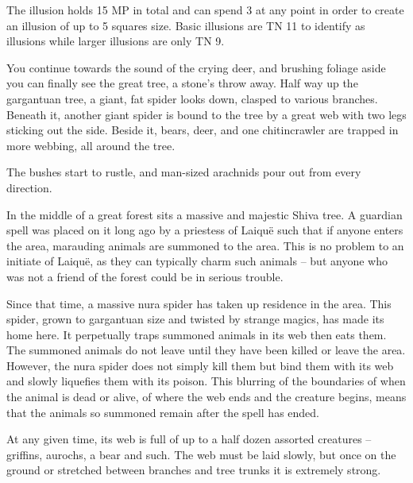 \begin{multicols}{2}
The illusion holds 15 MP in total and can spend 3 at any point in order to create an illusion of up to 5 squares size.  Basic illusions are TN 11 to identify as illusions while larger illusions are only TN 9.


\begin{boxtext}

	You continue towards the sound of the crying deer, and brushing foliage aside you can finally see the great tree, a stone's throw away.
	Half way up the gargantuan tree, a giant, fat spider looks down, clasped to various branches.
	Beneath it, another giant spider is bound to the tree by a great web with two legs sticking out the side.
	Beside it, bears, deer, and one chitincrawler are trapped in more webbing, all around the tree.

	The bushes start to rustle, and man-sized arachnids pour out from every direction.

\end{boxtext}

In the middle of a great forest sits a massive and majestic Shiva tree.
A guardian spell was placed on it long ago by a priestess of Laiqu\"{e} such that if anyone enters the area, marauding animals are summoned to the area.
This is no problem to an initiate of Laiqu\"{e}, as they can typically charm such animals -- but anyone who was not a friend of the forest could be in serious trouble.

Since that time, a massive nura spider has taken up residence in the area.  This spider, grown to gargantuan size and twisted by strange magics, has made its home here.  It perpetually traps summoned animals in its web then eats them.  The summoned animals do not leave until they have been killed or leave the area.  However, the nura spider does not simply kill them but bind them with its web and slowly liquefies them with its poison.  This blurring of the boundaries of when the animal is dead or alive, of where the web ends and the creature begins, means that the animals so summoned remain after the spell has ended.

At any given time, its web is full of up to a half dozen assorted creatures -- griffins, aurochs, a bear and such.
The web must be laid slowly, but once on the ground or stretched between branches and tree trunks it is extremely strong.



\end{multicols}
